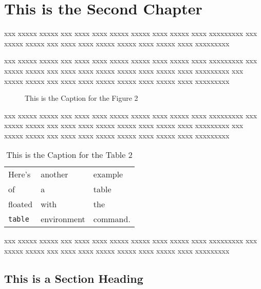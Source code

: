 
\chapter{This is the Second Chapter}
 
xxx xxxxx xxxxx xxx xxxx xxxx xxxxx xxxxx xxxx xxxxx xxxx xxxxxxxxx
xxx xxxxx xxxxx xxx xxxx xxxx xxxxx xxxxx xxxx xxxxx xxxx xxxxxxxxx
 
xxx xxxxx xxxxx xxx xxxx xxxx xxxxx xxxxx xxxx xxxxx xxxx xxxxxxxxx
xxx xxxxx xxxxx xxx xxxx xxxx xxxxx xxxxx xxxx xxxxx xxxx xxxxxxxxx
xxx xxxxx xxxxx xxx xxxx xxxx xxxxx xxxxx xxxx xxxxx xxxx xxxxxxxxx
 
\begin{figure}
\vspace{2.0in}
\caption{This is the Caption for the Figure 2}
\end{figure}
 
xxx xxxxx xxxxx xxx xxxx xxxx xxxxx xxxxx xxxx xxxxx xxxx xxxxxxxxx
xxx xxxxx xxxxx xxx xxxx xxxx xxxxx xxxxx xxxx xxxxx xxxx xxxxxxxxx
xxx xxxxx xxxxx xxx xxxx xxxx xxxxx xxxxx xxxx xxxxx xxxx xxxxxxxxx
 
\begin{table}[top]
\begin{center}
\begin{tabular}{lll}
Here's       & another     & example  \\
of           & a           & table    \\
floated      & with        & the      \\
\verb+table+ & environment & command.
\end{tabular}
\end{center}
\caption{This is the Caption for the Table 2}
\end{table}
 
xxx xxxxx xxxxx xxx xxxx xxxx xxxxx xxxxx xxxx xxxxx xxxx xxxxxxxxx
xxx xxxxx xxxxx xxx xxxx xxxx xxxxx xxxxx xxxx xxxxx xxxx xxxxxxxxx
 
\section{This is a Section Heading}
 
